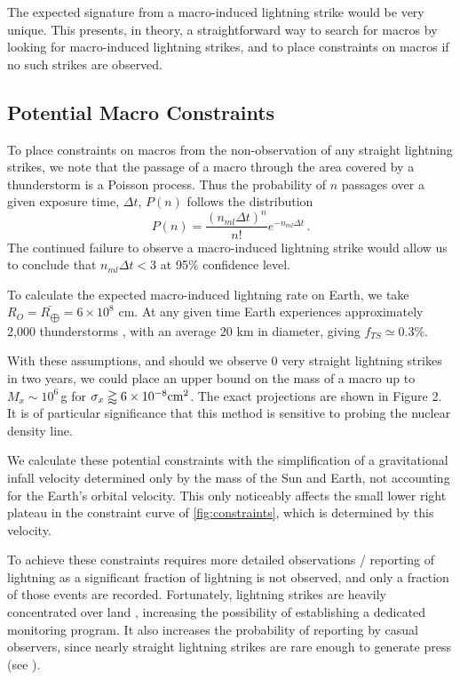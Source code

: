 \documentclass[%
 reprint,
 amsmath,amssymb,
 aps,
]{revtex4-2}
\begin{document}
        The expected signature from a macro-induced lightning strike would be very unique. This presents, in theory, a straightforward way to search for macros by looking for macro-induced lightning strikes, and to place constraints on macros if no such strikes are observed. 


    \subsection{Potential Macro Constraints} %
    \label{sub:macro_constraints_on_earth}

        To place constraints on macros from the non-observation of any straight lightning strikes, we note that the passage of a macro through the area covered by a thunderstorm is a Poisson process. Thus the probability of $n$ passages over a given exposure time, $\Delta t$, $P(n)$ follows the distribution
        \begin{equation}\label{eq:poisson}
            P(n) = \frac{\left({n_{ml} \Delta t}\right)^n}{n!} e^{-n_{ml} \Delta t}\,.
        \end{equation}
        The continued failure to observe a macro-induced lightning strike would allow us to conclude that $n_{ml}\Delta t<3$ at 95$\%$ confidence level.

        To calculate the expected macro-induced lightning rate on Earth, we take $R_{O} = \bar{R_{\bigoplus}} = 6 \times 10^8$ cm. At any given time Earth experiences approximately 2,000 thunderstorms \citep{NatGeo}, with an average $20$ km in diameter, giving $f_{TS}\simeq 0.3\%$.

        With these assumptions, and should we observe 0 very straight lightning strikes in two years, we could place an upper bound on the mass of a macro up to $M_x \sim 10^6\,$g for $\sigma_x\gtrapprox6\times10^{-8}{\rm cm}^2$. The exact projections are shown in Figure 2. It is of particular significance that this method is sensitive to probing the nuclear density line.
        
        We calculate these potential constraints with the simplification of a gravitational infall velocity determined only by the mass of the Sun and Earth, not accounting for the Earth's orbital velocity. This only noticeably affects the small lower right plateau in the constraint curve of \ref{fig:constraints}, which is determined by this velocity.

        To achieve these constraints requires more detailed observations / reporting of lightning as a significant fraction of lightning is not observed, and only a fraction of those events are recorded. Fortunately, lightning strikes are heavily concentrated over land \citep{Christian2003}, increasing the possibility of establishing a dedicated monitoring program. It also increases the probability of reporting by casual observers, since nearly straight lightning strikes are rare enough to generate press (see \citet{Zimbabwe}).
\end{document}
